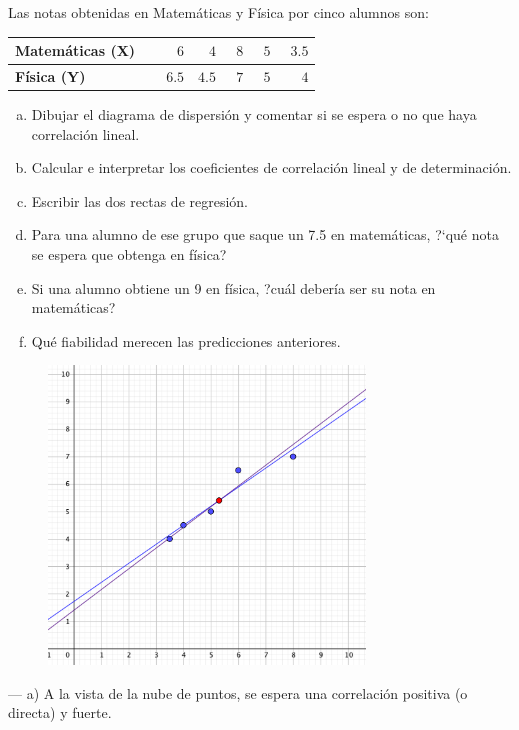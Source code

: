 \begin{ejemplo}
\begin{ejre}
Las notas obtenidas en Matemáticas y Física por cinco alumnos son:

\begin{table}[H]
\centering
\begin{tabular}{l|rrrrr}
\textbf{Matemáticas (X)} & $\qquad 6$ &  $\ \ 4$ &  $\ \ 8$ &  $\ \ 5$ &  $\ \ 3.5$ \\ \hline
\textbf{Física (Y)} & $6.5$ & $4.5$ & $7$ & $5$ & $4$
\end{tabular}
\end{table}

\begin{adjustwidth}{20pt}{10pt}
\begin{enumerate}[a) ]
\item Dibujar el diagrama de dispersión y comentar si se espera o no que haya correlación lineal.
\item Calcular e interpretar los coeficientes de correlación lineal y de determinación.
\item Escribir las dos rectas de regresión.
\item Para una alumno de ese grupo que saque	 un 7.5 en matemáticas, ?`qué nota se espera que obtenga en física?
\item Si una alumno obtiene un 9 en física, ?cuál debería ser su nota en matemáticas?
\item Qué fiabilidad merecen las predicciones anteriores.
\end{enumerate}
\end{adjustwidth}
\vspace{5mm}

	\begin{figure}[H]
			\centering
			\includegraphics[width=0.75\textwidth]{imagenes/imagenes03/T03IM13.png}
	\end{figure}
--- a) A la vista de la nube de puntos, se espera una correlación positiva (o directa) y fuerte.


\end{ejre}
\end{ejemplo}
